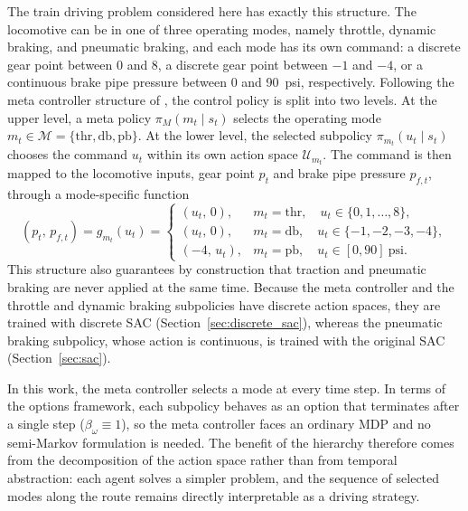 \documentclass[preprint,10pt]{elsarticle}
\begin{document}
The train driving problem considered here has exactly this structure. The locomotive can be in one of three operating modes, namely throttle, dynamic braking, and pneumatic braking, and each mode has its own command: a discrete gear point between 0 and 8, a discrete gear point between $-1$ and $-4$, or a continuous brake pipe pressure between 0 and 90~psi, respectively. Following the meta controller structure of \citet{kulkarni2016hierarchical}, the control policy is split into two levels. At the upper level, a meta policy $\pi_M(m_t \mid s_t)$ selects the operating mode $m_t \in \mathcal{M} = \{\text{thr}, \text{db}, \text{pb}\}$. At the lower level, the selected subpolicy $\pi_{m_t}(u_t \mid s_t)$ chooses the command $u_t$ within its own action space $\mathcal{U}_{m_t}$. The command is then mapped to the locomotive inputs, gear point $p_t$ and brake pipe pressure $p_{f,t}$, through a mode-specific function
\begin{equation}
    (p_t, \, p_{f,t}) = g_{m_t}(u_t) =
    \begin{cases}
        (u_t, \, 0), & m_t = \text{thr}, \quad u_t \in \{0, 1, \dots, 8\}, \\
        (u_t, \, 0), & m_t = \text{db}, \quad u_t \in \{-1, -2, -3, -4\}, \\
        (-4, \, u_t), & m_t = \text{pb}, \quad u_t \in [0, 90]~\text{psi}.
    \end{cases}
    \label{eq:mode_mapping}
\end{equation}
This structure also guarantees by construction that traction and pneumatic braking are never applied at the same time. Because the meta controller and the throttle and dynamic braking subpolicies have discrete action spaces, they are trained with discrete SAC (Section~\ref{sec:discrete_sac}), whereas the pneumatic braking subpolicy, whose action is continuous, is trained with the original SAC (Section~\ref{sec:sac}).

In this work, the meta controller selects a mode at every time step. In terms of the options framework, each subpolicy behaves as an option that terminates after a single step ($\beta_\omega \equiv 1$), so the meta controller faces an ordinary MDP and no semi-Markov formulation is needed. The benefit of the hierarchy therefore comes from the decomposition of the action space rather than from temporal abstraction: each agent solves a simpler problem, and the sequence of selected modes along the route remains directly interpretable as a driving strategy.
\end{document}

